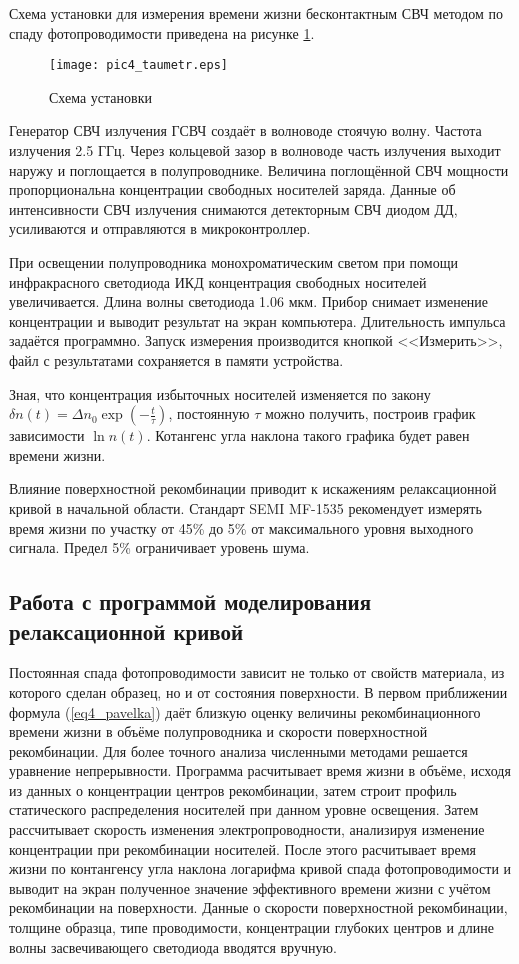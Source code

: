 Схема установки для измерения времени жизни бесконтактным СВЧ методом по спаду фотопроводимости приведена на рисунке \ref{pic4_taumetr}.

\begin{figure}[h!]\centering
\texttt{[image: pic4\_taumetr.eps]}
\caption{Схема установки}
\label{pic4_taumetr}
\end{figure}

Генератор СВЧ излучения ГСВЧ создаёт в волноводе стоячую волну. Частота излучения 2.5 ГГц. Через кольцевой зазор в волноводе часть излучения выходит наружу и поглощается в полупроводнике. Величина поглощённой СВЧ мощности пропорциональна концентрации свободных носителей заряда. Данные об интенсивности СВЧ излучения снимаются детекторным СВЧ диодом ДД, усиливаются и отправляются в микроконтроллер.

При освещении полупроводника монохроматическим светом при помощи инфракрасного светодиода ИКД концентрация свободных носителей увеличивается. Длина волны светодиода 1.06 мкм. Прибор снимает изменение концентрации и выводит результат на экран компьютера. Длительность импульса задаётся программно. Запуск измерения производится кнопкой <<Измерить>>, файл с результатами сохраняется в памяти устройства.

Зная, что концентрация избыточных носителей изменяется по закону $\delta n(t) = \Delta n_{0} \exp(-\frac{t}{\tau})$, постоянную $\tau$ можно получить, построив график зависимости $\ln n(t)$. Котангенс угла наклона такого графика будет равен времени жизни.

Влияние поверхностной рекомбинации приводит к искажениям релаксационной кривой в начальной области. Стандарт SEMI MF-1535 рекомендует измерять время жизни по участку от 45\% до 5\% от максимального уровня выходного сигнала. Предел 5\% ограничивает уровень шума.

\subsection{Работа с программой моделирования релаксационной кривой}

Постоянная спада фотопроводимости зависит не только от свойств материала, из которого сделан образец, но и от состояния поверхности. В первом приближении формула (\ref{eq4_pavelka}) даёт близкую оценку величины рекомбинационного времени жизни в объёме полупроводника и скорости поверхностной рекомбинации. Для более точного анализа численными методами решается уравнение непрерывности. Программа расчитывает время жизни в объёме, исходя из данных о концентрации центров рекомбинации, затем строит профиль статического распределения носителей при данном уровне освещения. Затем рассчитывает скорость изменения электропроводности, анализируя изменение концентрации при рекомбинации носителей. После этого расчитывает время жизни по контангенсу угла наклона логарифма кривой спада фотопроводимости и выводит на экран полученное значение эффективного времени жизни с учётом рекомбинации на поверхности. Данные о скорости поверхностной рекомбинации, толщине образца, типе проводимости, концентрации глубоких центров и длине волны засвечивающего светодиода вводятся вручную.


